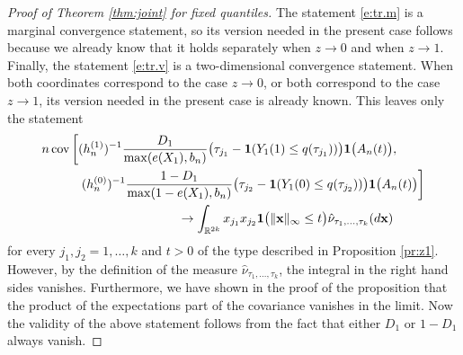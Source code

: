 \documentclass[12pt]{amsart}
\newcommand{\bbr}{\mathbb{R}}
\newcommand{\cov}{\mathrm{cov}}
\newcommand{\1}{\mathbbm{1}}
\newcommand{\0}{\mathbf{0}}
\newcommand{\one}{\mathbf{1}}
\theoremstyle{plain}
\theoremstyle{definition}
\newcommand{\bx}{\mathbf{x}}
\begin{document}
\begin{proof}[Proof of Theorem \ref{thm:joint} for fixed quantiles]
The statement \eqref{e:tr.m} is a marginal convergence statement, so
its  version needed in the present case follows because we already
know that it holds separately when $z\to 0$ and when $z\to
1$. 
Finally, the statement \eqref{e:tr.v} is a two-dimensional
convergence statement. When both coordinates correspond to the case
$z\to 0$, or both correspond to the case $z\to 1$, its version needed
in the present case is already known. This leaves only the statement  
\begin{align*} 
&n\, \cov\left[ (h_n^{(1)})^{-1}\frac{D_1}{\max(e(X_1),b_n)}
  \bigl( \tau_{j_1}-\one(Y_1(1)\leq q(\tau_{j_1}))\bigr)  \one\bigl(
                               A_n(t)\bigr), \right. \\
\notag &\left. \hskip 0.4in (h_n^{(0)})^{-1}\frac{1-D_1}{\max(1-e(X_1),b_n)}
  \bigl( \tau_{j_2}-\one(Y_1(0)\leq q(\tau_{j_2}))\bigr)  \one\bigl(
                               A_n(t)\bigr)\right] \\
\notag &\hskip 1.5in 
 \to
\int_{\bbr^{2k}} x_{j_1}x_{j_2}\one\bigl( \|\bx\|_\infty\leq t\bigr)
\hat \nu_{\tau_1,\ldots, \tau_k}(d\bx)  
\end{align*}
for every $j_1,j_2=1,\ldots, k$ and $t>0$ of the type described in Proposition \ref{pr:z1}. However, by the definition of the measure $\hat \nu_{\tau_1,\ldots, \tau_k}$, the integral in the right hand sides vanishes. Furthermore, we have shown in the proof of the proposition that the product of the expectations part of the covariance vanishes in the limit. Now the validity of the above statement follows from the fact that either $D_1$ or $1-D_1$ always vanish. 
 \end{proof}
\end{document}
